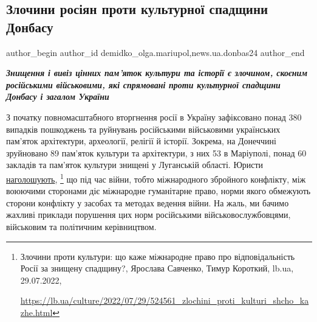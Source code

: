  
 
 
 
 
 
\subsection{Злочини росіян проти культурної спадщини Донбасу}
\label{sec:11_08_2022.stz.news.ua.donbas24.1.zlochyny_rosian_proty_kulturn_spadchyny_donbasu}
 
\ifcmt
 author_begin
   author_id demidko_olga.mariupol,news.ua.donbas24
 author_end
\fi


\begin{center}
  \em\bfseries\Large
Знищення і вивіз цінних пам'яток культури та історії є злочином, скоєним
російськими військовими, які спрямовані проти культурної спадщини
Донбасу і загалом України
\end{center}

З початку повномасштабного вторгнення росії в Україну зафіксовано понад 380
випадків пошкоджень та руйнувань російськими військовими українських пам'яток
архітектури, археології, релігії й історії. Зокрема, на Донеччині зруйновано 89
пам'яток культури та архітектури, з них 53 в Маріуполі, понад 60 закладів та
пам'яток культури знищені у Луганській області. Юристи
\href{https://lb.ua/culture/2022/07/29/524561_zlochini_proti_kulturi_shcho_kazhe.html}{наголошують},%
\footnote{Злочини проти культури: що каже міжнародне право про відповідальність Росії за знищену спадщину?, %
Ярослава Савченко, Тимур Короткий, %
lb.ua, 29.07.2022, \par%
\url{https://lb.ua/culture/2022/07/29/524561_zlochini_proti_kulturi_shcho_kazhe.html}%
}
що під час війни, тобто міжнародного збройного конфлікту, між воюючими
сторонами діє міжнародне гуманітарне право, норми якого обмежують сторони
конфлікту у засобах та методах ведення війни. На жаль, ми бачимо жахливі
приклади порушення цих норм російськими військовослужбовцями, військовим та
політичним керівництвом.

